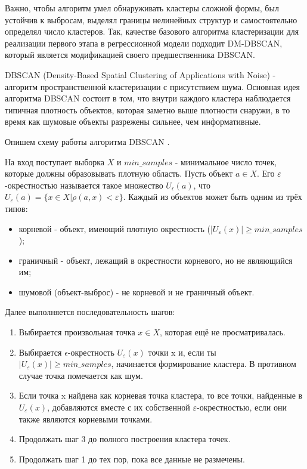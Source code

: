 \documentclass{article}
\begin{document}
Важно, чтобы алгоритм умел обнаруживать кластеры сложной формы, был устойчив к выбросам, выделял границы нелинейных структур и самостоятельно определял число кластеров.
Так, качестве базового алгоритма кластеризации для реализации первого этапа в регрессионной модели подходит DM-DBSCAN, который является модификацией своего предшественника DBSCAN.

DBSCAN (Density-Based Spatial Clustering of Applications with Noise) - алгоритм пространственной кластеризации с присутствием шума. Основная идея алгоритма DBSCAN \cite{author6} состоит в том, что внутри каждого кластера наблюдается типичная плотность объектов, которая заметно выше плотности снаружи, в то время как шумовые объекты разрежены сильнее, чем информативные.

Опишем схему работы алгоритма DBSCAN \cite{author5_year}.

На вход поступает выборка $X$ и $min\_samples$ - минимальное число точек, которые должны образовывать плотную область. Пусть объект $a \in X$. Его $\varepsilon$-окрестностью называется такое множество $U_{\epsilon}(a)$, что $U_{\varepsilon}(a) = \{x \in X | \rho(a,x) < \varepsilon\}$. Каждый из объектов может быть одним из трёх типов:
    \begin{itemize}
        \item корневой - объект, имеющий плотную окрестность (|$U_{\varepsilon}(x)| \geq  min\_samples$);
        \item граничный - объект, лежащий в окрестности корневого, но не являющийся им;
        \item шумовой (объект-выброс) - не корневой и не граничный объект.
    \end{itemize}

Далее выполняется последовательность шагов:

    \begin{enumerate}
        \item Выбирается произвольная точка $x \in X$, которая ещё не просматривалась.
        \item Выбирается $\epsilon$-окрестность $U_{\varepsilon}(x)$ точки x и, если ты $|U_{\varepsilon}(x)| \geq min\_samples$, начинается формирование кластера. В противном случае точка помечается как шум.
        \item Если точка x найдена как корневая точка кластера, то все точки, найденные в $U_{\varepsilon}(x)$, добавляются вместе с их собственной $\varepsilon$-окрестностью, если они также являются корневыми точками.
        \item Продолжать шаг 3 до полного построения кластера точек.
        \item Продолжать шаг 1 до тех пор, пока все данные не размечены.
    \end{enumerate}
\end{document}
